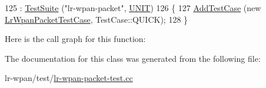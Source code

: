 \begin{DoxyCode}
125   : \hyperlink{classns3_1_1TestSuite_a904b0c40583b744d30908aeb94636d1a}{TestSuite} (\textcolor{stringliteral}{"lr-wpan-packet"}, \hyperlink{classns3_1_1TestSuite_a1ebfcab34ec8161e085e8e3a1855eae0a3885375a3787abf60431f8454b3cadbd}{UNIT})
126 \{
127   \hyperlink{classns3_1_1TestCase_a3718088e3eefd5d6454569d2e0ddd835}{AddTestCase} (\textcolor{keyword}{new} \hyperlink{classLrWpanPacketTestCase}{LrWpanPacketTestCase}, TestCase::QUICK);
128 \}
\end{DoxyCode}


Here is the call graph for this function\+:




The documentation for this class was generated from the following file\+:\begin{DoxyCompactItemize}
\item 
lr-\/wpan/test/\hyperlink{lr-wpan-packet-test_8cc}{lr-\/wpan-\/packet-\/test.\+cc}\end{DoxyCompactItemize}
